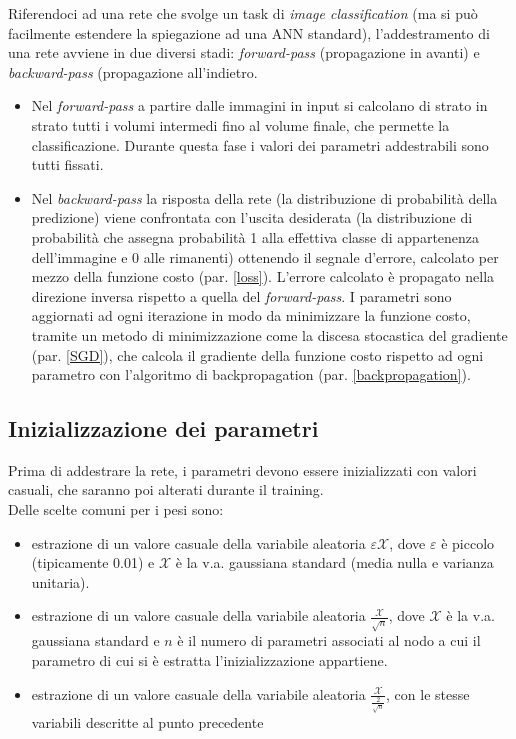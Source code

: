 Riferendoci ad una rete che svolge un task di \textit{image classification} (ma si può facilmente estendere la spiegazione ad una ANN standard), l'addestramento di una rete avviene in due diversi stadi: \textit{forward-pass} (propagazione in avanti) e \textit{backward-pass} (propagazione all'indietro.
\begin{itemize}
\item Nel \textit{forward-pass} a partire dalle immagini in input si calcolano di strato in strato tutti i volumi intermedi fino al volume finale, che permette la classificazione. Durante questa fase i valori dei parametri addestrabili sono tutti fissati.
\item Nel \textit{backward-pass} la risposta della rete (la distribuzione di probabilità della predizione) viene confrontata con l'uscita desiderata (la distribuzione di probabilità che assegna probabilità 1 alla effettiva classe di appartenenza dell'immagine e 0 alle rimanenti) ottenendo il segnale d'errore, calcolato per mezzo della funzione costo (par. \ref{loss}). L'errore calcolato è propagato nella direzione inversa rispetto a quella del \textit{forward-pass}. I parametri sono aggiornati ad ogni iterazione in modo da minimizzare la funzione costo, tramite un metodo di minimizzazione come la discesa stocastica del gradiente (par. \ref{SGD}), che calcola il gradiente della funzione costo rispetto ad ogni parametro con l'algoritmo di backpropagation (par. \ref{backpropagation}).
\end{itemize}

\subsection{Inizializzazione dei parametri}
\label{weights}
Prima di addestrare la rete, i parametri devono essere inizializzati con valori casuali, che saranno poi alterati durante il training.\\
Delle scelte comuni per i pesi sono:
\begin{itemize}
\item estrazione di un valore casuale della variabile aleatoria $\varepsilon \mathcal{X}$, dove $\varepsilon$ è piccolo (tipicamente 0.01) e $\mathcal{X}$ è la v.a. gaussiana standard (media nulla e varianza unitaria).
\item estrazione di un valore casuale della variabile aleatoria $\frac{\mathcal{X}}{\sqrt{n}}$, dove $\mathcal{X}$ è la v.a. gaussiana standard e $n$ è il numero di parametri associati al nodo a cui il parametro di cui si è estratta l'inizializzazione appartiene.
\item estrazione di un valore casuale della variabile aleatoria $\frac{\mathcal{X}}{\frac{2}{\sqrt{n}}}$, con le stesse variabili descritte al punto precedente
\end{itemize}

